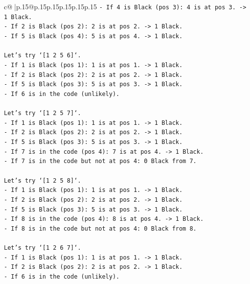 \documentclass{article}
\begin{document}
{\begin{supertabular}{c@{$\;$}|p{.15\linewidth}@{}p{.15\linewidth}p{.15\linewidth}p{.15\linewidth}p{.15\linewidth}p{.15\linewidth}}
{{{\texttt{{-} If 4 is Black (pos 3): 4 is at pos 3. {-}> 1 Black.} \\
\texttt{{-} If 2 is Black (pos 2): 2 is at pos 2. {-}> 1 Black.} \\
\texttt{{-} If 5 is Black (pos 4): 5 is at pos 4. {-}> 1 Black.} \\
\\ 
\texttt{Let's try `{[}1 2 5 6{]}`.} \\
\texttt{{-} If 1 is Black (pos 1): 1 is at pos 1. {-}> 1 Black.} \\
\texttt{{-} If 2 is Black (pos 2): 2 is at pos 2. {-}> 1 Black.} \\
\texttt{{-} If 5 is Black (pos 3): 5 is at pos 3. {-}> 1 Black.} \\
\texttt{{-} If 6 is in the code (unlikely).} \\
\\ 
\texttt{Let's try `{[}1 2 5 7{]}`.} \\
\texttt{{-} If 1 is Black (pos 1): 1 is at pos 1. {-}> 1 Black.} \\
\texttt{{-} If 2 is Black (pos 2): 2 is at pos 2. {-}> 1 Black.} \\
\texttt{{-} If 5 is Black (pos 3): 5 is at pos 3. {-}> 1 Black.} \\
\texttt{{-} If 7 is in the code (pos 4): 7 is at pos 4. {-}> 1 Black.} \\
\texttt{{-} If 7 is in the code but not at pos 4: 0 Black from 7.} \\
\\ 
\texttt{Let's try `{[}1 2 5 8{]}`.} \\
\texttt{{-} If 1 is Black (pos 1): 1 is at pos 1. {-}> 1 Black.} \\
\texttt{{-} If 2 is Black (pos 2): 2 is at pos 2. {-}> 1 Black.} \\
\texttt{{-} If 5 is Black (pos 3): 5 is at pos 3. {-}> 1 Black.} \\
\texttt{{-} If 8 is in the code (pos 4): 8 is at pos 4. {-}> 1 Black.} \\
\texttt{{-} If 8 is in the code but not at pos 4: 0 Black from 8.} \\
\\ 
\texttt{Let's try `{[}1 2 6 7{]}`.} \\
\texttt{{-} If 1 is Black (pos 1): 1 is at pos 1. {-}> 1 Black.} \\
\texttt{{-} If 2 is Black (pos 2): 2 is at pos 2. {-}> 1 Black.} \\
\texttt{{-} If 6 is in the code (unlikely).} \\
}}}
\end{supertabular}}
\end{document}
